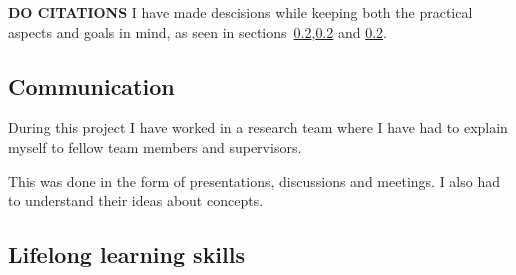 \textbf{DO CITATIONS}
I have made descisions while keeping both the practical aspects and goals in mind, as seen in sections~\ref{},\ref{} and \ref{}.


\subsection{Communication}
During this project I have worked in a research team where I have had to explain myself to fellow team members and supervisors.

This was done in the form of presentations, discussions and meetings.
I also had to understand their ideas about concepts.


\subsection{Lifelong learning skills}


